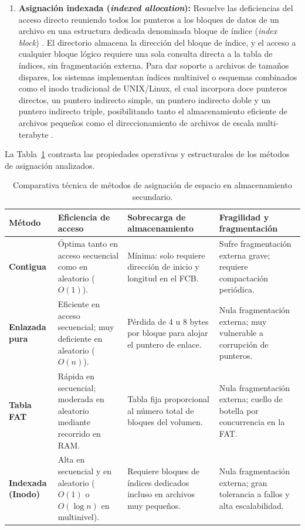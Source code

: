 \documentclass[12pt]{article}
\begin{document}
\begin{enumerate}[noitemsep, topsep=2pt]
    \item \textbf{Asignación indexada (\textit{indexed allocation}):} Resuelve las deficiencias del acceso directo reuniendo todos los punteros a los bloques de datos de un archivo en una estructura dedicada denominada bloque de índice (\textit{index block}) \parencite[\S 11.4.3, p.\ 385]{silberschatz2006fundamentos}. El directorio almacena la dirección del bloque de índice, y el acceso a cualquier bloque lógico requiere una sola consulta directa a la tabla de índices, sin fragmentación externa. Para dar soporte a archivos de tamaños dispares, los sistemas implementan índices multinivel o esquemas combinados como el inodo tradicional de UNIX/Linux, el cual incorpora doce punteros directos, un puntero indirecto simple, un puntero indirecto doble y un puntero indirecto triple, posibilitando tanto el almacenamiento eficiente de archivos pequeños como el direccionamiento de archivos de escala multi-terabyte \parencite[\S 11.4.3, pp.\ 386--387]{silberschatz2006fundamentos}.
\end{enumerate}

La Tabla~\ref{tab:comparativaMetodosAsignacion} contrasta las propiedades operativas y estructurales de los métodos de asignación analizados.

\begin{table}[H]
\centering
\footnotesize
\renewcommand{\arraystretch}{1.0}
\renewcommand{\tabularxcolumn}[1]{m{#1}}
\setlength{\emergencystretch}{2em}
\caption{Comparativa técnica de métodos de asignación de espacio en almacenamiento secundario.}
\label{tab:comparativaMetodosAsignacion}
\begin{tabularx}{\textwidth}{>{\centering\arraybackslash}m{2.4cm} X X X}
\toprule
\textbf{Método} & \textbf{Eficiencia de acceso} & \textbf{Sobrecarga de almacenamiento} & \textbf{Fragilidad y fragmentación} \\
\midrule
\textbf{Contigua} & Óptima tanto en acceso secuencial como en aleatorio ($O(1)$). & Mínima: solo requiere dirección de inicio y longitud en el FCB. & Sufre fragmentación externa grave; requiere compactación periódica. \\
\addlinespace
\textbf{Enlazada pura} & Eficiente en acceso secuencial; muy deficiente en aleatorio ($O(n)$). & Pérdida de 4 u 8 bytes por bloque para alojar el puntero de enlace. & Nula fragmentación externa; muy vulnerable a corrupción de punteros. \\
\addlinespace
\textbf{Tabla FAT} & Rápida en secuencial; moderada en aleatorio mediante recorrido en RAM. & Tabla fija proporcional al número total de bloques del volumen. & Nula fragmentación externa; cuello de botella por concurrencia en la FAT. \\
\addlinespace
\textbf{Indexada (Inodo)} & Alta en secuencial y en aleatorio ($O(1)$ o $O(\log n)$ en multinivel). & Requiere bloques de índices dedicados incluso en archivos muy pequeños. & Nula fragmentación externa; gran tolerancia a fallos y alta escalabilidad. \\
\bottomrule
\end{tabularx}
\end{table}
\end{document}
